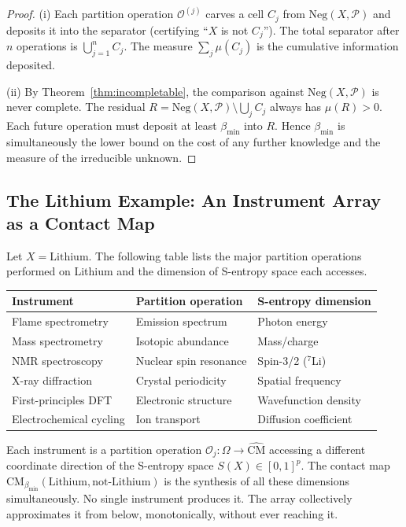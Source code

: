 \documentclass[12pt,a4paper,twocolumn]{article}
\theoremstyle{plain}
\theoremstyle{definition}
\theoremstyle{remark}
\newcommand{\Part}{\mathcal{P}}
\newcommand{\CM}{\mathrm{CM}}
\newcommand{\bmin}{\beta_{\min}}
\newcommand{\Neg}{\mathrm{Neg}}
\newcommand{\CMbmin}{\CM_{\bmin}}
\begin{document}
\begin{proof}
(i) Each partition operation $\mathcal{O}^{(j)}$ carves a cell $C_j$ from
$\Neg(X, \Part)$ and deposits it into the separator (certifying ``$X$ is
not $C_j$'').  The total separator after $n$ operations is
$\bigcup_{j=1}^n C_j$.  The measure $\sum_j \mu(C_j)$ is the cumulative
information deposited.

(ii) By Theorem~\ref{thm:incompletable}, the comparison against
$\Neg(X, \Part)$ is never complete.  The residual $R = \Neg(X, \Part)
\setminus \bigcup_j C_j$ always has $\mu(R) > 0$.  Each future operation
must deposit at least $\bmin$ into $R$.  Hence $\bmin$ is simultaneously
the lower bound on the cost of any further knowledge and the measure of
the irreducible unknown.
\end{proof}

\subsection{The Lithium Example: An Instrument Array as a Contact Map}

Let $X = \text{Lithium}$.  The following table lists the major partition
operations performed on Lithium and the dimension of S-entropy space each
accesses.

\begin{center}
\begin{tabular}{lll}
  \toprule
  Instrument & Partition operation & S-entropy dimension \\
  \midrule
  Flame spectrometry & Emission spectrum & Photon energy \\
  Mass spectrometry  & Isotopic abundance & Mass/charge \\
  NMR spectroscopy   & Nuclear spin resonance & Spin-3/2 (${}^7$Li) \\
  X-ray diffraction  & Crystal periodicity & Spatial frequency \\
  First-principles DFT & Electronic structure & Wavefunction density \\
  Electrochemical cycling & Ion transport & Diffusion coefficient \\
  \bottomrule
\end{tabular}
\end{center}

Each instrument is a partition operation $\mathcal{O}_j : \Omega \to
\hat{\CM}$ accessing a different coordinate direction of the S-entropy
space $S(X) \in [0,1]^p$.  The contact map $\CMbmin(\text{Lithium},
\text{not-Lithium})$ is the synthesis of all these dimensions
simultaneously.  No single instrument produces it.  The array collectively
approximates it from below, monotonically, without ever reaching it.
\end{document}
